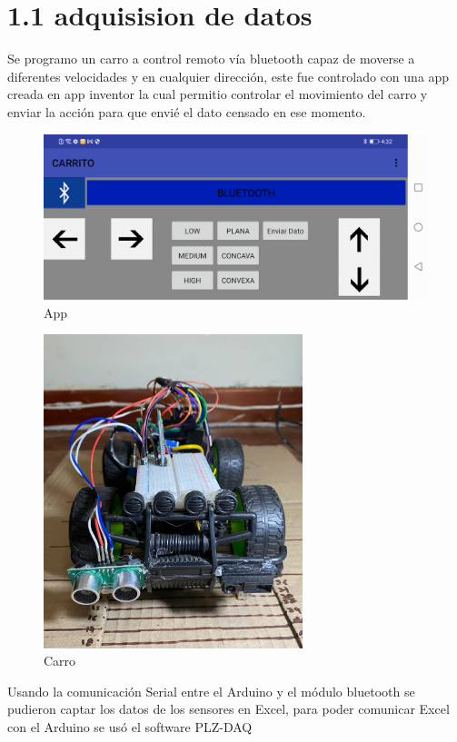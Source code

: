 \documentclass[
]{article}
\begin{document}
\hypertarget{adquisision-de-datos}{%
\section{1.1 adquisision de datos}\label{adquisision-de-datos}}

Se programo un carro a control remoto vía bluetooth capaz de moverse a
diferentes velocidades y en cualquier dirección, este fue controlado con
una app creada en app inventor la cual permitio controlar el movimiento
del carro y enviar la acción para que envié el dato censado en ese
momento.

\begin{figure}
\centering
\includegraphics[width=4.91667in,height=\textheight]{app.png}
\caption{App}
\end{figure}

\begin{figure}
\centering
\includegraphics[width=2.96875in,height=\textheight]{carro.png}
\caption{Carro}
\end{figure}

Usando la comunicación Serial entre el Arduino y el módulo bluetooth se
pudieron captar los datos de los sensores en Excel, para poder comunicar
Excel con el Arduino se usó el software PLZ-DAQ
\end{document}
